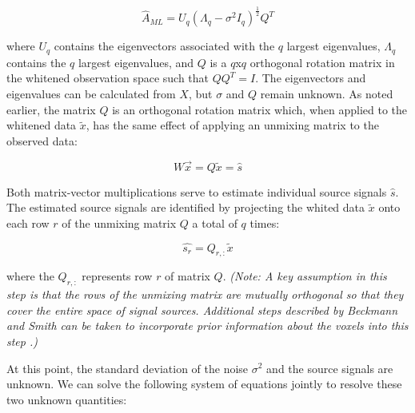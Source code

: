 {\begin{equation}
\hat{A}_{ML} = U_q(\Lambda_q - \sigma ^2 I_q)^{\frac{1}{2}}Q^T
\end{equation}

\noindent where $U_q$ contains the eigenvectors associated with the $q$ largest eigenvalues, $\Lambda_q$ contains the $q$ largest eigenvalues, and $Q$ is a $q$x$q$ orthogonal rotation matrix in the whitened observation space such that $QQ^T = I$. %
The eigenvectors and eigenvalues can be calculated from $X$, but $\sigma$ and $Q$ remain unknown. As noted earlier, the matrix $Q$ is an orthogonal rotation matrix which, when applied to the whitened data $\tilde{x}$, has the same effect of applying an unmixing matrix to the observed data: 

\begin{equation}
\label{ch3:eq:unmixing-01}
W \vec{x} = Q \tilde{x} = \hat{s}
\end{equation}

\noindent Both matrix-vector multiplications serve to estimate individual source signals $\hat{s}$. The estimated source signals are identified by projecting the whited data $\tilde{x}$ onto each row $r$ of the unmixing matrix $Q$ a total of $q$ times:

\begin{equation}
\hat{s_r} = Q_{r,:} \tilde{x}
\end{equation}

\noindent where the $Q_{r, :}$ represents row $r$ of matrix $Q$.  \textit{(Note: A key assumption in this step is that the rows of the unmixing matrix are mutually orthogonal so that they cover the entire space of signal sources. Additional steps described by Beckmann and Smith can be taken to incorporate prior information about the voxels into this step \cite{Beckmann2004}.)}

At this point, the standard deviation of the noise $\sigma^2$ and the source signals are unknown. We can solve the following system of equations jointly to resolve these two unknown quantities:

}
